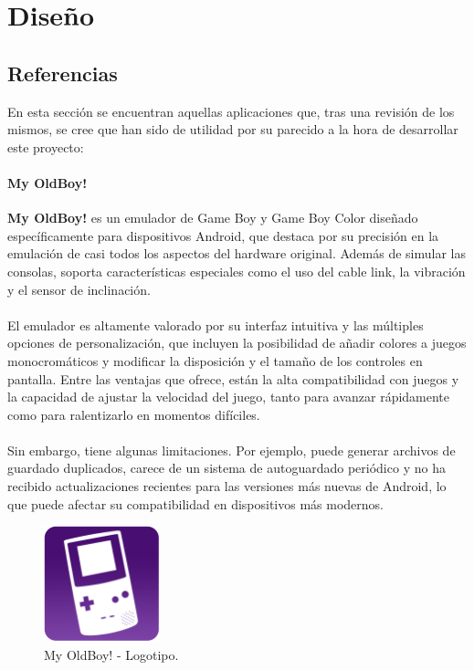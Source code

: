 \chapter{Diseño}
\label{design}

\section{Referencias}
En esta sección se encuentran aquellas aplicaciones que, tras una revisión de los mismos, se cree que han sido de utilidad por su parecido a la hora de desarrollar este proyecto:

\subsubsection{My OldBoy!}

\textbf{My OldBoy!} es un emulador de Game Boy y Game Boy Color diseñado específicamente para dispositivos Android, que destaca por su precisión en la emulación de casi todos los aspectos del hardware original. Además de simular las consolas, soporta características especiales como el uso del cable link, la vibración y el sensor de inclinación.
\\\\
El emulador es altamente valorado por su interfaz intuitiva y las múltiples opciones de personalización, que incluyen la posibilidad de añadir colores a juegos monocromáticos y modificar la disposición y el tamaño de los controles en pantalla. Entre las ventajas que ofrece, están la alta compatibilidad con juegos y la capacidad de ajustar la velocidad del juego, tanto para avanzar rápidamente como para ralentizarlo en momentos difíciles.
\\\\
Sin embargo, tiene algunas limitaciones. Por ejemplo, puede generar archivos de guardado duplicados, carece de un sistema de autoguardado periódico y no ha recibido actualizaciones recientes para las versiones más nuevas de Android, lo que puede afectar su compatibilidad en dispositivos más modernos.

\begin{figure}[H]
    \centering
    \includegraphics[width=0.3\textwidth]{include/images/myoldboy.png}
    \caption{My OldBoy! - Logotipo.}
    \label{figure:oldboylogo}
\end{figure}

